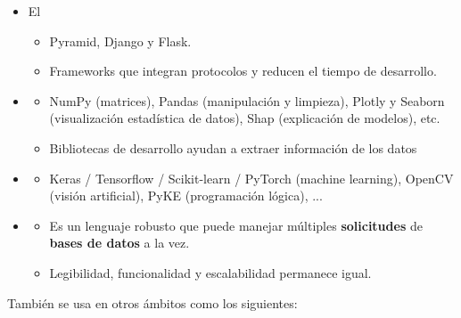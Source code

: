 \begin{itemize}
\item El 
\begin{itemize}
\item Pyramid, Django y Flask.
\item Frameworks que integran protocolos y reducen el tiempo de desarrollo.
\end{itemize}

\item {}
\begin{itemize}
\item NumPy (matrices), Pandas (manipulación y limpieza), Plotly y Seaborn (visualización estadística de datos), Shap (explicación de modelos), etc. 
\item Bibliotecas de desarrollo ayudan a extraer información  de los datos
\end{itemize}

\item {}
\begin{itemize}
\item Keras / Tensorflow / Scikit-learn / PyTorch (machine learning), OpenCV (visión artificial), PyKE (programación lógica), ...
\end{itemize}

\item {}
\begin{itemize}
\item Es un lenguaje robusto que puede manejar múltiples \textbf{solicitudes} de \textbf{bases de datos} a la vez.
\item Legibilidad, funcionalidad y escalabilidad permanece igual.
\end{itemize}
\end{itemize}


\noindent También se usa en otros ámbitos como los siguientes:

